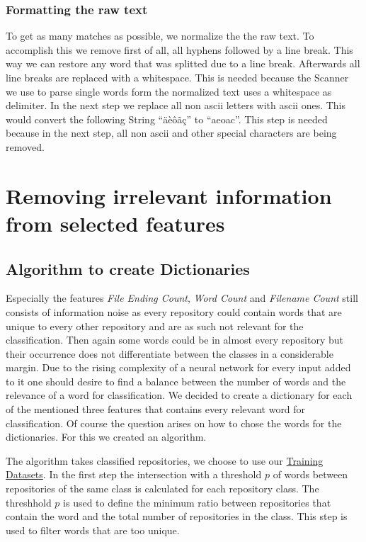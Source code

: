\documentclass[paper=A4,pagesize=auto,12pt,headinclude=true,footinclude=true,BCOR=0mm,DIV=calc]{scrartcl}
\begin{document}
	
	
	\subsubsection{Formatting the raw text}
	To get as many matches as possible, we  normalize the the raw text. To    accomplish this we remove first of all, all hyphens followed by a line break. This way we can restore any word that was splitted due to a line break. Afterwards all line breaks are replaced with a whitespace. This is needed because the Scanner we use to parse single words form the normalized text uses a whitespace as delimiter. In the next step we replace all non ascii letters with ascii ones. This would convert the following String “äèôãç” to “aeoac”. This step is needed because in the next step, all non ascii and other special characters are being removed.
	
	
	\section{Removing irrelevant information from selected features}
	\label{sec: dictionary}
	\subsection{Algorithm to create Dictionaries}
	Especially the features \textit{File Ending Count}, \textit{Word Count} and\textit{ Filename Count} still consists of information noise as every repository could contain words that are unique to every other repository and are as such not relevant for the classification. Then again some words could be in almost every repository but their occurrence does not differentiate between the classes in a considerable margin. Due to the rising complexity of a neural network for every input added to it one should desire to find a balance between the number of words and the relevance of a word for classification. We decided to create a dictionary for each of the mentioned three features that contains every relevant word for classification.
	Of course the question arises on how to chose the words for the dictionaries. For this we created an algorithm.
	
	The algorithm takes classified repositories, we choose to use our \hyperref[src:Repositories]{Training Datasets}.
	In the first step the intersection with a threshold $p$ of words between repositories of the same class is calculated for each repository class. The threshhold $p$ is used to define the minimum ratio between repositories that contain the word and the total number of repositories in the class. 
	This step is used to filter words that are too unique.
	
\end{document}
